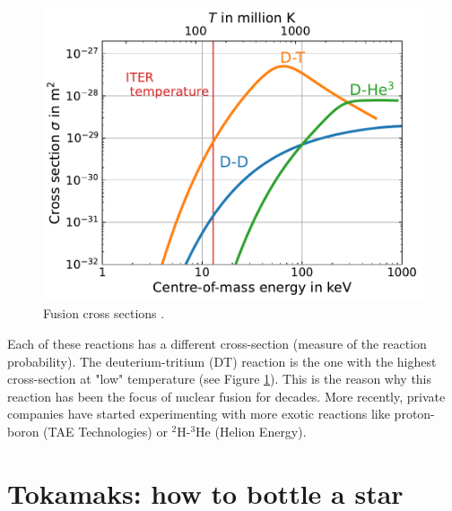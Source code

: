 \begin{figure} [h]
    \centering
    \includegraphics[width=\linewidth]{Figures/Chapter1/cross_sections_vs_temperature__Bosch.pdf}
    \caption{Fusion cross sections \cite{forrest_fendl-3_2012}.}
    \label{fig: fusion cross sections}
\end{figure}
Each of these reactions has a different cross-section (measure of the reaction probability).
The deuterium-tritium (DT) reaction is the one with the highest cross-section at "low" temperature (see Figure \ref{fig: fusion cross sections}).
This is the reason why this reaction has been the focus of nuclear fusion for decades.
More recently, private companies have started experimenting with more exotic reactions like proton-boron (TAE Technologies) or $^2$H-$^3$He (Helion Energy).


\section{Tokamaks: how to bottle a star}

